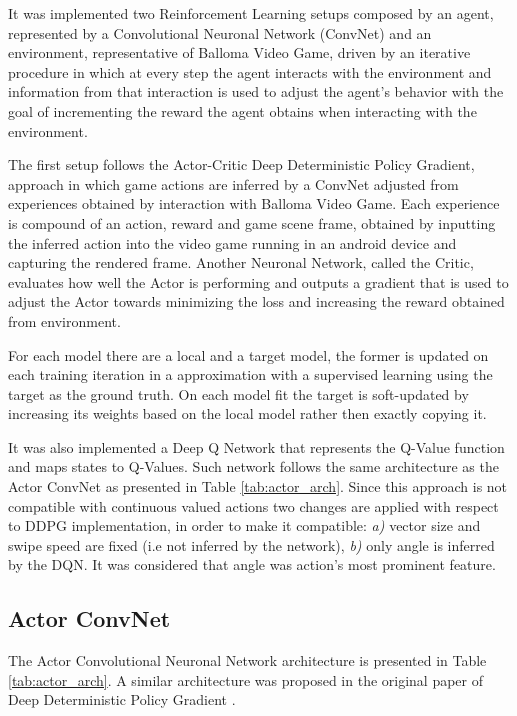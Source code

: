 \documentclass[peerreview,onecolumn]{IEEEtran}
\begin{document}
	  It was implemented two Reinforcement Learning setups composed by an agent, represented by a Convolutional Neuronal Network (ConvNet) and an environment, representative of Balloma Video Game, driven by an iterative procedure in which at every step the agent interacts with the environment and information from that interaction is used to adjust the agent's behavior with the goal of incrementing the reward the agent obtains when interacting with the environment. 
	  
	 The first setup follows the Actor-Critic Deep Deterministic Policy Gradient, approach in which game actions are inferred by a ConvNet adjusted from experiences obtained by interaction with Balloma Video Game. Each experience is compound of an action, reward and game scene frame, obtained by inputting the inferred action into the video game running in an android device and capturing the rendered frame. Another Neuronal Network, called the Critic, evaluates how well the Actor is performing and outputs a gradient that is used to adjust the Actor towards minimizing the loss and increasing the reward obtained from environment.
	 
	 For each model there are a local and a target model, the former is updated on each training iteration in a approximation with a supervised learning using the target as the ground truth. On each model fit the target is soft-updated by increasing its weights based on the local model rather then exactly copying it.
	 
	 It was also implemented a Deep Q Network \cite{deep_q_n} that represents the Q-Value function and maps states to Q-Values. Such network follows the same architecture as the Actor ConvNet as presented in Table \ref{tab:actor_arch}. Since this approach is not compatible with continuous valued actions two changes are applied with respect to DDPG implementation, in order to make it compatible: \textit{a)} vector size and swipe speed are fixed (i.e not inferred by the network), \textit{b)} only angle is inferred by the DQN. It was considered that angle was action's most prominent feature.  
	 
	 \subsection{Actor ConvNet}
	 
	 The Actor Convolutional Neuronal Network architecture is presented in Table \ref{tab:actor_arch}. A similar architecture was proposed in the original paper of Deep Deterministic Policy Gradient \cite{ddpg_2015}. 
	 
\end{document}
